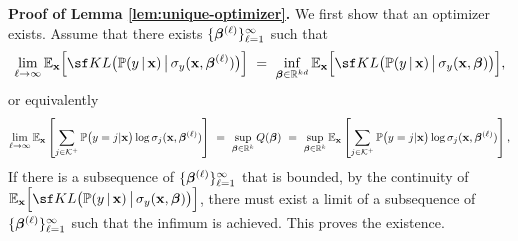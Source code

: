 \noindent
\textbf{Proof of Lemma \ref{lem:unique-optimizer}.}
We first show that an optimizer exists. 
Assume that there exists $\{\bm{\beta}^{(\ell)}\}_{\ell=1}^{\infty}$ such that 
$$\lim_{\ell \rightarrow \infty}\E_{\x}\Big[
    {\sf KL}\big( \Prob(y\,|\, \x)\,\big\vert\,\sigma_{y}(\x, \betavec^{(\ell)}) \big)
    \Big] ~=~ \inf_{\betavec \in \Real^{kd}}\E_{\x}\Big[
    {\sf KL}\big( \Prob(y\,|\, \x)\,\big\vert\,\sigma_{y}(\x, \betavec) \big)
    \Big], $$
or equivalently 
\begin{align}
\label{eqn:optimality-sequence}
    \lim_{\ell \rightarrow \infty}\mathbb{E}_{\mathbf{x}}\left[
    \sum_{j\in \mathcal{K}^+} \mathbb{P}\big(y = j| \mathbf{x}\big)\log\sigma_{j}(\mathbf{x}, \bm{\beta}^{(\ell)})
    \right] ~=~\sup_{\bm{\beta} \in \mathbb{R}^{k}}Q(\bm{\beta})~=~ \sup_{\bm{\beta} \in \mathbb{R}^{k}}\mathbb{E}_{\mathbf{x}}\left[
    \sum_{j\in \mathcal{K}^+} \mathbb{P}\big(y = j| \mathbf{x}\big)\log\sigma_{j}(\mathbf{x}, \bm{\beta}^{(\ell)})
    \right],
\end{align}
If there is a subsequence of $\{\bm{\beta}^{(\ell)}\}_{\ell=1}^{\infty}$ that is bounded, by the continuity of $\E_{\x}\Big[
{\sf KL}\big( \Prob(y\,|\, \x)\,\big\vert\,\sigma_{y}(\x, \betavec) \big)\Big]$, there must exist a limit of a subsequence of $\{\bm{\beta}^{(\ell)}\}_{\ell=1}^{\infty}$ such that the infimum is achieved. 
This proves the existence. 

